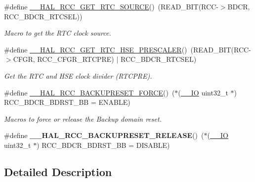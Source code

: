 \begin{DoxyCompactItemize}
\#define \mbox{\hyperlink{group___r_c_c___internal___r_t_c___clock___configuration_gad40d00ff1c984ebd011ea9f6e7f93c44}{\+\_\+\+\_\+\+H\+A\+L\+\_\+\+R\+C\+C\+\_\+\+G\+E\+T\+\_\+\+R\+T\+C\+\_\+\+S\+O\+U\+R\+CE}}()~(R\+E\+A\+D\+\_\+\+B\+IT(R\+CC-\/$>$B\+D\+CR, R\+C\+C\+\_\+\+B\+D\+C\+R\+\_\+\+R\+T\+C\+S\+EL))
\begin{DoxyCompactList}\small\item\em Macro to get the R\+TC clock source. \end{DoxyCompactList}\item 
\#define \mbox{\hyperlink{group___r_c_c___internal___r_t_c___clock___configuration_ga85dc62f0fcb14981c47d7f7da25e26d6}{\+\_\+\+\_\+\+H\+A\+L\+\_\+\+R\+C\+C\+\_\+\+G\+E\+T\+\_\+\+R\+T\+C\+\_\+\+H\+S\+E\+\_\+\+P\+R\+E\+S\+C\+A\+L\+ER}}()~(R\+E\+A\+D\+\_\+\+B\+IT(R\+CC-\/$>$C\+F\+GR, R\+C\+C\+\_\+\+C\+F\+G\+R\+\_\+\+R\+T\+C\+P\+RE) $\vert$ R\+C\+C\+\_\+\+B\+D\+C\+R\+\_\+\+R\+T\+C\+S\+EL)
\begin{DoxyCompactList}\small\item\em Get the R\+TC and H\+SE clock divider (R\+T\+C\+P\+RE). \end{DoxyCompactList}\item 
\#define \mbox{\hyperlink{group___r_c_c___internal___r_t_c___clock___configuration_ga3bf7da608ff985873ca8e248fb1dc4f0}{\+\_\+\+\_\+\+H\+A\+L\+\_\+\+R\+C\+C\+\_\+\+B\+A\+C\+K\+U\+P\+R\+E\+S\+E\+T\+\_\+\+F\+O\+R\+CE}}()~($\ast$(\mbox{\hyperlink{core__sc300_8h_aec43007d9998a0a0e01faede4133d6be}{\+\_\+\+\_\+\+IO}} uint32\+\_\+t $\ast$) R\+C\+C\+\_\+\+B\+D\+C\+R\+\_\+\+B\+D\+R\+S\+T\+\_\+\+BB = E\+N\+A\+B\+LE)
\begin{DoxyCompactList}\small\item\em Macros to force or release the Backup domain reset. \end{DoxyCompactList}\item 
\mbox{\label{group___r_c_c___internal___r_t_c___clock___configuration_ga14f32622c65f4ae239ba8cb00d510321}} 
\#define {\bfseries \+\_\+\+\_\+\+H\+A\+L\+\_\+\+R\+C\+C\+\_\+\+B\+A\+C\+K\+U\+P\+R\+E\+S\+E\+T\+\_\+\+R\+E\+L\+E\+A\+SE}()~($\ast$(\mbox{\hyperlink{core__sc300_8h_aec43007d9998a0a0e01faede4133d6be}{\+\_\+\+\_\+\+IO}} uint32\+\_\+t $\ast$) R\+C\+C\+\_\+\+B\+D\+C\+R\+\_\+\+B\+D\+R\+S\+T\+\_\+\+BB = D\+I\+S\+A\+B\+LE)
\end{DoxyCompactItemize}


\subsection{Detailed Description}


